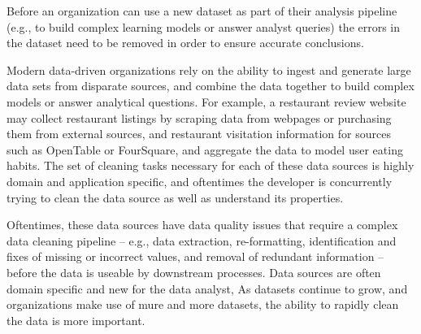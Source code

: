 Before an organization can use a new dataset as part of their analysis pipeline
(e.g., to build complex learning models or answer analyst queries)
the errors in the dataset need to be removed in order to ensure accurate conclusions.  

Modern data-driven organizations rely on the ability to ingest and generate large data sets from 
disparate sources, and combine the data together to build complex models or answer analytical questions.  
For example, a restaurant review website may collect restaurant listings by scraping data from webpages or purchasing them from external sources, and
restaurant visitation information for sources such as OpenTable or FourSquare, and aggregate the data to
model user eating habits.  
The set of cleaning tasks necessary for each of these data sources is highly domain and application specific,
and oftentimes the developer is concurrently trying to clean the data source as well as understand its properties.


Oftentimes, these data sources have data quality issues that require a complex data cleaning pipeline -- 
e.g., data extraction, re-formatting, identification and fixes of missing or incorrect values,
and removal of redundant information -- before the data is useable by downstream processes.
Data sources are often domain specific and new for the data analyst, 
As datasets continue to grow, and organizations make use of mure and more datasets, the ability to
rapidly clean the data is more important.  
\fi
